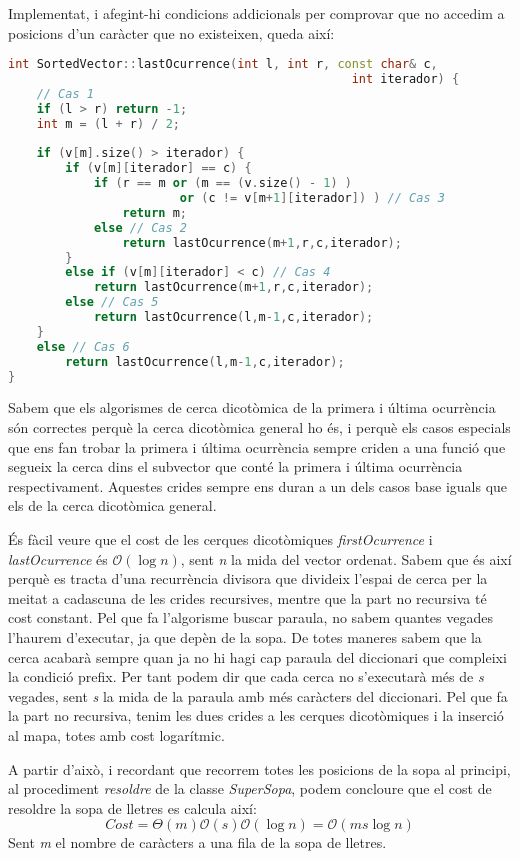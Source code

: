 \documentclass[titlepage]{article}
\begin{document}
Implementat, i afegint-hi condicions addicionals per comprovar que no accedim a posicions d'un caràcter que no existeixen, queda així: \newline
\begin{lstlisting}[language=C++]
int SortedVector::lastOcurrence(int l, int r, const char& c,
                                                int iterador) {
    // Cas 1    
    if (l > r) return -1;
    int m = (l + r) / 2;
   
    if (v[m].size() > iterador) {
        if (v[m][iterador] == c) {
            if (r == m or (m == (v.size() - 1) ) 
                        or (c != v[m+1][iterador]) ) // Cas 3
                return m;
            else // Cas 2
                return lastOcurrence(m+1,r,c,iterador);
        }
        else if (v[m][iterador] < c) // Cas 4
            return lastOcurrence(m+1,r,c,iterador);
        else // Cas 5
            return lastOcurrence(l,m-1,c,iterador);
    }
    else // Cas 6
        return lastOcurrence(l,m-1,c,iterador);   
}
\end{lstlisting}

Sabem que els algorismes de cerca dicotòmica de la primera i última ocurrència són correctes perquè la cerca dicotòmica general ho és, i perquè els casos especials que ens fan trobar la primera i última ocurrència sempre criden a una funció que segueix la cerca dins el subvector que conté la primera i última ocurrència respectivament. Aquestes crides sempre ens duran a un dels casos base iguals que els de la cerca dicotòmica general.\newline\par
És fàcil veure que el cost de les cerques dicotòmiques \textit{firstOcurrence} i \textit{lastOcurrence} és $\mathcal{O}(\log{}n)$, sent \textit{n} la mida del vector ordenat. Sabem que és així perquè es tracta d'una recurrència divisora que divideix l'espai de cerca per la meitat a cadascuna de les crides recursives, mentre que la part no recursiva té cost constant.\newline
Pel que fa l'algorisme buscar paraula, no sabem quantes vegades l'haurem d'executar, ja que depèn de la sopa. De totes maneres sabem que la cerca acabarà sempre quan ja no hi hagi cap paraula del diccionari que compleixi la condició prefix. Per tant podem dir que cada cerca no s'executarà més de \textit{s} vegades, sent \textit{s} la mida de la paraula amb més caràcters del diccionari. Pel que fa la part no recursiva, tenim les dues crides a les cerques dicotòmiques i la inserció al mapa, totes amb cost logarítmic.\par
A partir d'això, i recordant que recorrem totes les posicions de la sopa al principi, al procediment \textit{resoldre} de la classe \textit{SuperSopa}, podem concloure que el cost de resoldre la sopa de lletres es calcula així:
\[ Cost = \Theta(m)\mathcal{O}(s)\mathcal{O}(\log{n}) =  \mathcal{O}(ms\log{n})\]
Sent \textit{m} el nombre de caràcters a una fila de la sopa de lletres.
\end{document}
